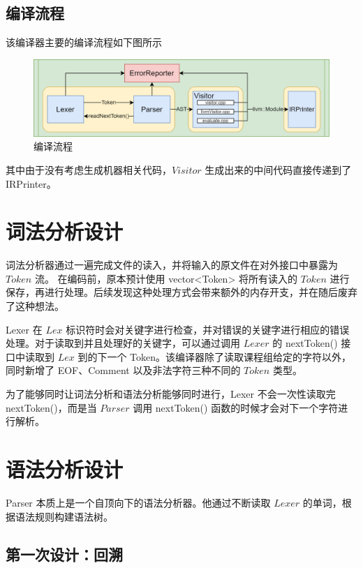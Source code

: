 \documentclass[a4paper]{article}
\begin{document}
		\subsection{编译流程}
		
			该编译器主要的编译流程如下图所示
			
			\begin{figure}[H]
				\centering
				\includegraphics[width=0.9\linewidth]{images/proc.png}
				\caption{编译流程}
				\label{fig:label4}	
			\end{figure}
			
			其中由于没有考虑生成机器相关代码，$Visitor$ 生成出来的中间代码直接传递到了 IRPrinter。
	
	\section{词法分析设计}
	
		词法分析器通过一遍完成文件的读入，并将输入的原文件在对外接口中暴露为 $Token$ 流。 
		在编码前，原本预计使用 vector<Token> 将所有读入的 $Token$ 进行保存，再进行处理。后续发现这种处理方式会带来额外的内存开支，并在随后废弃了这种想法。
		
		Lexer 在 $Lex$ 标识符时会对关键字进行检查，并对错误的关键字进行相应的错误处理。对于读取到并且处理好的关键字，可以通过调用 $Lexer$ 的 nextToken() 接口中读取到 $Lex$ 到的下一个 Token。该编译器除了读取课程组给定的字符以外，同时新增了 EOF、Comment 以及非法字符三种不同的 $Token$ 类型。
		
        为了能够同时让词法分析和语法分析能够同时进行，Lexer 不会一次性读取完 nextToken()，而是当 $Parser$ 调用 nextToken() 函数的时候才会对下一个字符进行解析。
	
	\section{语法分析设计}

		Parser 本质上是一个自顶向下的语法分析器。他通过不断读取 $Lexer$ 的单词，根据语法规则构建语法树。
		
		\subsection{第一次设计：回溯}
		
\end{document}
